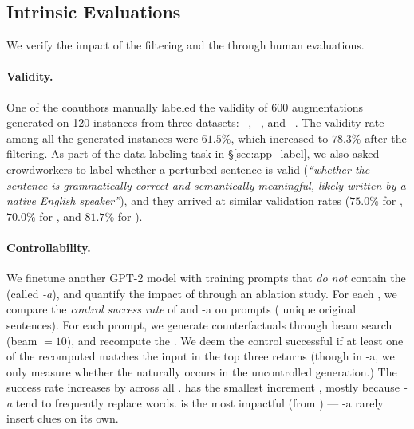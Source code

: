 
\subsection{Intrinsic Evaluations}
\label{subsec:intrinsic}
We verify the impact of the filtering and the \tagstrs through human evaluations.
\paragraph{Validity.}
One of the coauthors manually labeled the validity of 600 augmentations generated on 120 instances from three datasets: \dsst~\cite{socher2013recursive}, \dnli~\cite{bowman-etal-2015-large}, and \dqqp~\cite{wang2018glue}.
The validity rate among all the generated instances were $61.5\%$, which increased to $78.3\%$ after the filtering. 
As part of the data labeling task in \S\ref{sec:app_label}, we also asked crowdworkers to label whether a perturbed sentence is valid (\emph{``whether the sentence is grammatically correct and semantically meaningful, likely written by a native English speaker''}), and they arrived at similar validation rates ($75.0\%$ for \dsst, $70.0\%$ for \dqqp, and $81.7\%$ for \dnli).


\paragraph{Controllability.}
We finetune another GPT-2 model with training prompts that \emph{do not} contain the \tagstrshorts (called \emph{\sysname-a}), and quantify the impact of \tagstrs through an ablation study.
For each \tagstr, we compare the \emph{control success rate} of \sysname and \sysname-a on  prompts ( unique original sentences).
For each prompt, we generate counterfactuals through beam search (beam $=10$), and recompute the \tagstrshorts.
We deem the control successful if at least one of the recomputed \tagstrshort matches the input in the top three returns (though in \sysname-a, we only measure whether the \tagstrshort naturally occurs in the uncontrolled generation.)
The success rate increases by  across all \tagstrs.
 has the smallest increment , mostly because \emph{\sysname-a} tend to frequently replace words.
 is the most impactful \tagstrshort (from ) --- \sysname-a rarely insert clues on its own.

